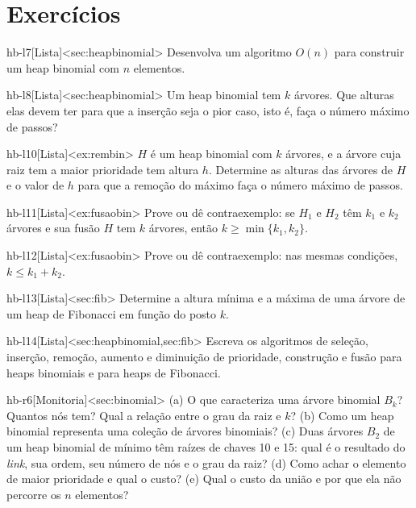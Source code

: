 \section{Exercícios}
\excurso
\begin{exercicio}{hb-l7}[Lista]<sec:heapbinomial>
Desenvolva um algoritmo $O(n)$ para construir um heap binomial com $n$ elementos.
\end{exercicio}
\begin{exercicio}{hb-l8}[Lista]<sec:heapbinomial>
Um heap binomial tem $k$ árvores. Que alturas elas devem ter para que a inserção seja o pior caso, isto é, faça o número máximo de passos?
\end{exercicio}
\begin{exercicio}{hb-l10}[Lista]<ex:rembin>
$H$ é um heap binomial com $k$ árvores, e a árvore cuja raiz tem a maior prioridade tem altura $h$. Determine as alturas das árvores de $H$ e o valor de $h$ para que a remoção do máximo faça o número máximo de passos.
\end{exercicio}
\begin{exercicio}{hb-l11}[Lista]<ex:fusaobin>
Prove ou dê contraexemplo: se $H_1$ e $H_2$ têm $k_1$ e $k_2$ árvores e sua fusão $H$ tem $k$ árvores, então $k\ge\min\{k_1,k_2\}$.
\end{exercicio}
\begin{exercicio}{hb-l12}[Lista]<ex:fusaobin>
Prove ou dê contraexemplo: nas mesmas condições, $k\le k_1+k_2$.
\end{exercicio}
\begin{exercicio}{hb-l13}[Lista]<sec:fib>
Determine a altura mínima e a máxima de uma árvore de um heap de Fibonacci em função do posto $k$.
\end{exercicio}
\begin{exercicio}{hb-l14}[Lista]<sec:heapbinomial,sec:fib>
Escreva os algoritmos de seleção, inserção, remoção, aumento e diminuição de prioridade, construção e fusão para heaps binomiais e para heaps de Fibonacci.
\end{exercicio}
\begin{exercicio}{hb-r6}[Monitoria]<sec:binomial>
(a) O que caracteriza uma árvore binomial $B_k$? Quantos nós tem? Qual a relação entre o grau da raiz e $k$? (b) Como um heap binomial representa uma coleção de árvores binomiais? (c) Duas árvores $B_2$ de um heap binomial de mínimo têm raízes de chaves 10 e 15: qual é o resultado do \emph{link}, sua ordem, seu número de nós e o grau da raiz? (d) Como achar o elemento de maior prioridade e qual o custo? (e) Qual o custo da união e por que ela não percorre os $n$ elementos?
\end{exercicio}
